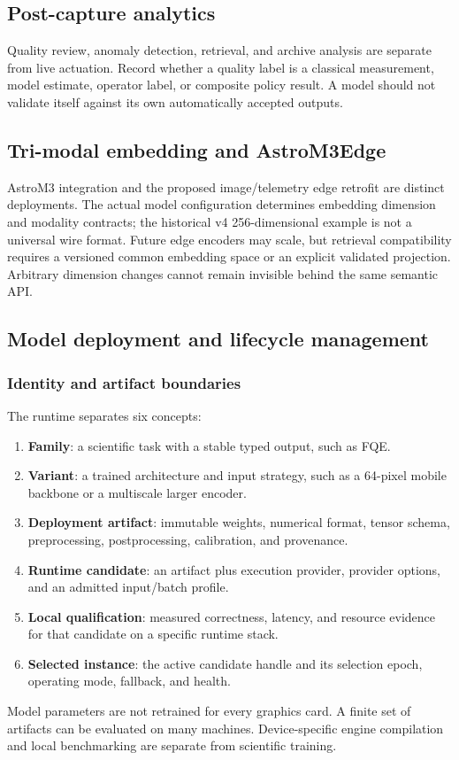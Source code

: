 \documentclass[11pt,a4paper]{article}
\begin{document}
\subsection{Post-capture analytics}
Quality review, anomaly detection, retrieval, and archive analysis are separate
from live actuation. Record whether a quality label is a classical measurement,
model estimate, operator label, or composite policy result. A model should not
validate itself against its own automatically accepted outputs.

\subsection{Tri-modal embedding and AstroM3Edge}
AstroM3 integration and the proposed image/telemetry edge retrofit are distinct
deployments. The actual model configuration determines embedding dimension and
modality contracts; the historical v4 256-dimensional example is not a universal
wire format. Future edge encoders may scale, but retrieval compatibility requires
a versioned common embedding space or an explicit validated projection. Arbitrary
dimension changes cannot remain invisible behind the same semantic API.

\subsection{Model deployment and lifecycle management}
\label{sec:runtime}
\subsubsection{Identity and artifact boundaries}
The runtime separates six concepts:
\begin{enumerate}
\item \textbf{Family}: a scientific task with a stable typed output, such as FQE.
\item \textbf{Variant}: a trained architecture and input strategy, such as a
64-pixel mobile backbone or a multiscale larger encoder.
\item \textbf{Deployment artifact}: immutable weights, numerical format,
tensor schema, preprocessing, postprocessing, calibration, and provenance.
\item \textbf{Runtime candidate}: an artifact plus execution provider,
provider options, and an admitted input/batch profile.
\item \textbf{Local qualification}: measured correctness, latency, and resource
evidence for that candidate on a specific runtime stack.
\item \textbf{Selected instance}: the active candidate handle and its
selection epoch, operating mode, fallback, and health.
\end{enumerate}
Model parameters are not retrained for every graphics card. A finite set of
artifacts can be evaluated on many machines. Device-specific engine compilation
and local benchmarking are separate from scientific training.
\end{document}
